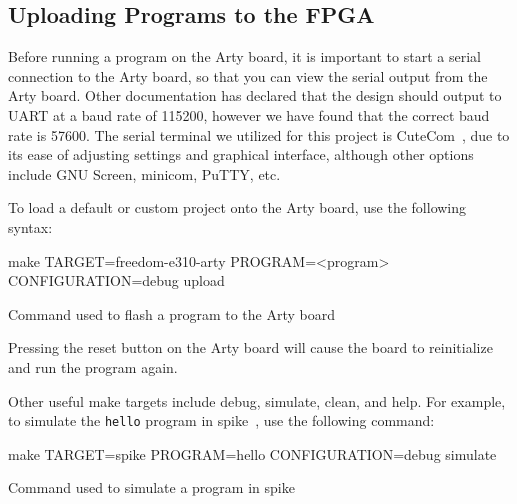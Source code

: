 \subsection{Uploading Programs to the FPGA}\label{sec:Upload_Programs_to_Flashed_FPGA}
Before running a program on the Arty board, it is important to start a serial connection to the Arty board, so that you can view the serial output from the Arty board.
Other documentation has declared that the design should output to UART at a baud rate of 115200, however we have found that the correct baud rate is 57600.
The serial terminal we utilized for this project is CuteCom~\cite{CuteCom}, due to its ease of adjusting settings and graphical interface, although other options include GNU Screen, minicom, PuTTY, etc.

To load a default or custom project onto the Arty board, use the following syntax:

\begin{listing}[h!tbp]
  \begin{bashsource}
    make TARGET=freedom-e310-arty PROGRAM=<program> CONFIGURATION=debug upload
  \end{bashsource}
  \caption{Command used to flash a program to the Arty board}
  \label{lst:upload_to_arty}
\end{listing}

Pressing the reset button on the Arty board will cause the board to reinitialize and run the program again.

Other useful make targets include debug, simulate, clean, and help.
For example, to simulate the \texttt{hello} program in \gls{spike}~\cite{SpikeSimulator}, use the following command:

\begin{listing}[h!tbp]
  \begin{bashsource}
    make TARGET=spike PROGRAM=hello CONFIGURATION=debug simulate
  \end{bashsource}
  \caption{Command used to simulate a program in \gls{spike}}
  \label{lst:simulate_in_spike}
\end{listing}


